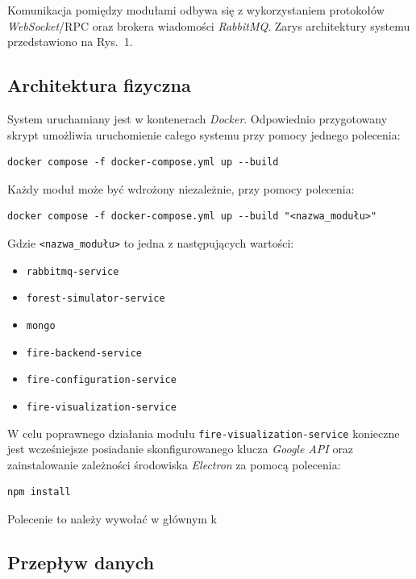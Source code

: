 \documentclass[11pt,a4paper]{article}
\begin{document}
Komunikacja pomiędzy modułami odbywa się z wykorzystaniem protokołów 
\textit{WebSocket}/RPC oraz brokera wiadomości \textit{RabbitMQ}. 
Zarys architektury systemu przedstawiono na Rys.~1.

\subsection{Architektura fizyczna}

System uruchamiany jest w kontenerach \textit{Docker}. 
Odpowiednio przygotowany skrypt umożliwia uruchomienie całego systemu 
przy pomocy jednego polecenia:

\begin{verbatim}
docker compose -f docker-compose.yml up --build
\end{verbatim}

Każdy moduł może być wdrożony niezależnie, przy pomocy polecenia:

\begin{verbatim}
docker compose -f docker-compose.yml up --build "<nazwa_modułu>"
\end{verbatim}

Gdzie \texttt{<nazwa\_modułu>} to jedna z następujących wartości:

\begin{itemize}
    \item \texttt{rabbitmq-service}
    \item \texttt{forest-simulator-service}
    \item \texttt{mongo}
    \item \texttt{fire-backend-service}
    \item \texttt{fire-configuration-service}
    \item \texttt{fire-visualization-service}
\end{itemize}

W celu poprawnego działania modułu 
\texttt{fire-visualization-service} konieczne jest wcześniejsze
posiadanie skonfigurowanego klucza \textit{Google API} oraz zainstalowanie
zależności środowiska \textit{Electron} za pomocą polecenia:

\begin{verbatim}
npm install
\end{verbatim}

Polecenie to należy wywołać w głównym k


\subsection{Przepływ danych}
\end{document}
